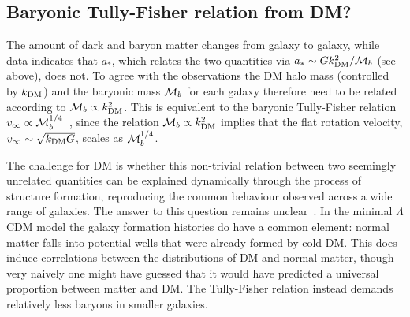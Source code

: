 \subsection{Baryonic Tully-Fisher relation from DM?}
\label{sec:Tully-Fisher}
The amount of dark and baryon matter  
changes from galaxy to galaxy,  while data indicates that $a_*$, 
which relates the two quantities via $a_* \sim G k_{\rm DM}^2/{\cal M}_b$ (see above), does not. 
To agree with the observations the DM halo mass (controlled by $k_{\rm DM}$) and the baryonic mass ${\cal M}_b$ for each galaxy therefore
need to be related according to ${\cal M}_b\propto k_{\rm DM}^2$.
This is equivalent to the baryonic Tully-Fisher relation $v_\infty \propto {\cal M}_b^{1/4}$~\cite{Tully-Fisher},
since the relation ${\cal M}_b\propto k_{\rm DM}^2$ implies that the flat rotation velocity, $v_\infty\sim\sqrt{k_{\rm DM}G}$, scales as ${\cal M}_b^{1/4}$. 

\smallskip



The challenge for DM is whether this non-trivial 
relation between two seemingly unrelated quantities can be explained dynamically through the process of  structure formation,
reproducing the common behaviour observed across a wide range of galaxies.
The answer to this question remains unclear~\cite{DMvsa0}. 
In the minimal $\Lambda$CDM model the galaxy formation histories do have a common element: 
normal matter falls into potential wells that were already formed by cold DM.
This does induce correlations between the distributions of DM and normal matter, though very naively one might have guessed that
it would have predicted a universal proportion between matter and DM. 
The Tully-Fisher relation instead demands  relatively less baryons in smaller galaxies.

\smallskip

